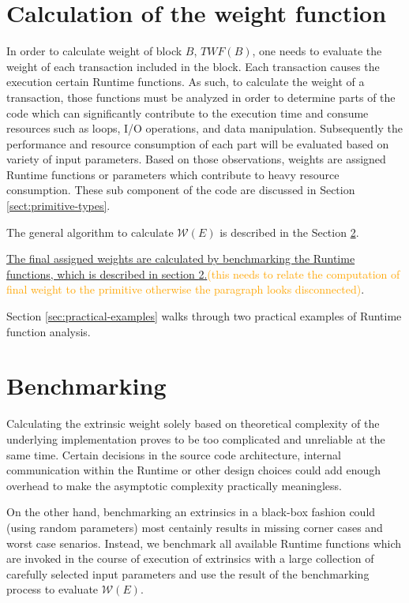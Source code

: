 \documentclass[11pt,a4paper]{article}
\newcommand{\syed}[2]{{\underline{#1}}\textcolor{orange}{(#2)}}
\newcommand{\TWF}{\ensuremath{\mathcal{W}}}
\begin{document}
\section{Calculation of the weight function}
\label{sec:runtime-primitives}
In order to calculate weight of block $B$, $TWF(B)$, one needs to evaluate the
weight of each transaction included in the block. Each transaction causes the
execution certain Runtime functions. As such, to calculate the weight of a
transaction, those functions must be analyzed in order to determine parts of the
code which can significantly contribute to the execution time and consume
resources such as  loops, I/O operations, and data manipulation. Subsequently
the performance and resource consumption of each part will be evaluated based on
variety of input parameters. Based on those observations, weights are assigned
Runtime functions or parameters which contribute to heavy resource consumption.
These sub component of the code are discussed in Section
\ref{sect:primitive-types}.
\newline

The general algorithm to calculate $\TWF(E)$ is described in the Section
\ref{sect:benchmarking}.
\newline

\syed{The final assigned weights are calculated by benchmarking the Runtime
functions, which is described in section \ref{sect:benchmarking}.}{this needs to
relate the computation of final weight to the primitive otherwise the paragraph
looks disconnected}.
\newline

Section \ref{sec:practical-examples} walks through two practical examples of
Runtime function analysis.

\section{Benchmarking}\label{sect:benchmarking} Calculating the extrinsic weight
solely based on theoretical complexity of the underlying implementation proves
to be too complicated and unreliable at the same time. Certain decisions in the
source code architecture, internal communication within the Runtime or other
design choices could add enough overhead to make the asymptotic complexity
practically meaningless.
\newline

On the other hand, benchmarking an extrinsics in a black-box fashion could
(using random parameters) most centainly results in missing corner cases and
worst case senarios. Instead, we benchmark all available Runtime functions which
are invoked in the course of execution of extrinsics with a large collection of
carefully selected input parameters and use the result of the benchmarking
process to evaluate $\TWF(E)$.
\newline
\end{document}

